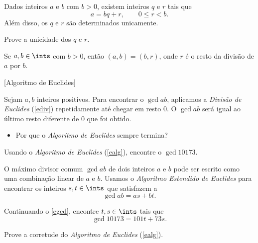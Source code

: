 \begin{definition}
\label{ediv}
%
    Dados inteiros $a$ e $b$ com $b > 0$, existem inteiros $q$ e $r$ tais que
    $$
        a = bq + r, \qquad 0 \leq r < b.
    $$
    Além disso, os $q$ e $r$ são determinados unicamente.
\end{definition}

\begin{exercise}
%
    Prove a unicidade dos $q$ e $r$.
\end{exercise}

\begin{exercise}
%
    Se $a, b\in\ints$ com $b > 0$, então $(a,b) = (b,r)$, onde $r$ é o resto da divisão de $a$ por $b$.
\end{exercise}

[Algoritmo de Euclides]
\begin{definition}
\label{ealg}
%
    Sejam $a, b$ inteiros positivos. Para encontrar o $\gcd a b$, aplicamos a \emph{Divisão de Euclides} (\ref{ediv}) repetidamente até chegar em resto 0. O $\gcd a b$ será igual ao último resto diferente de 0 que foi obtido.
    \begin{itemize}[--]
        \item Por que o \emph{Algoritmo de Euclides} sempre termina? 
    \end{itemize}
\end{definition}

\begin{exercise}
\label{egcd}
%
    Usando o \emph{Algoritmo de Euclides} (\ref{ealg}), encontre o $\gcd {101} {73}$.
\end{exercise}

\begin{definition}
%
    O máximo divisor comum $\gcd a b$ de dois inteiros $a$ e $b$ pode ser escrito como uma combinação linear de $a$ e $b$. Usamos o \emph{Algoritmo Estendido de Euclides} para encontrar os inteiros $s, t\in\ints$ que satisfazem a
    $$
        \gcd a b = as + bt.
    $$
\end{definition}

\begin{exercise}
%
    Continuando o \ref{egcd}, encontre $t,s\in\ints$ tais que
    $$
        \gcd {101} {73} = 101t + 73s.
    $$
\end{exercise}

\begin{homework}
%
    Prove a corretude do \emph{Algoritmo de Euclides} (\ref{ealg}).
\end{homework}

